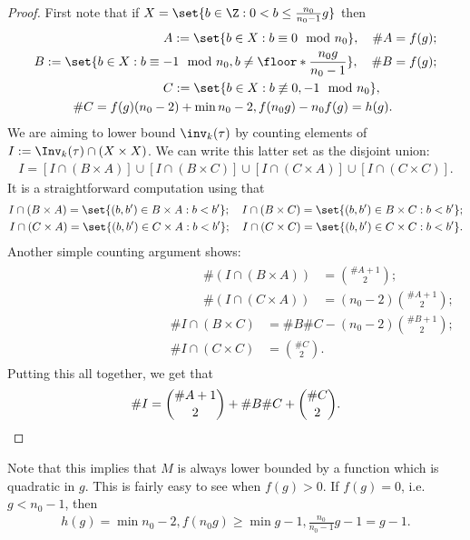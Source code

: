 \begin{proof}
    First note that if $X = \set{b \in \Z: 0<b\leq \frac{n_0}{n_0-1}g}$ then
    \begin{align*}
        A:= \set{b \in X:b \equiv 0 \mod n_0}, \quad \#A &= f(g);\\
        B:= \set{b \in X: b \equiv -1 \mod n_0, b \neq \floor*{\frac{n_0g}{n_0-1}}}, \quad \#B &= f(g);\\
        C:= \set{b \in X:b\not \equiv 0,-1 \mod n_0}, \quad \\\#C = f(g)(n_0-2) + \min{n_0-2,f(n_0g) -n_0 f(g)} = h(g).
    \end{align*}
    We are aiming to lower bound $\inv_k(\tau)$ by counting elements of $I:=\Inv_k(\tau) \cap (X \times X)$. We can write this latter set as the disjoint union:
    \begin{align*}
        I = [I\cap (B\times A)] \cup [I \cap (B\times C)]\cup [I\cap (C\times A)] \cup [I \cap (C\times C)].
    \end{align*}
    It is a straightforward computation using  that
    \begin{align*}
        I \cap (B\times A) = \set{(b,b') \in B\times A:b<b'}; \quad I \cap (B\times C) = \set{(b,b') \in B\times C:b<b'};\\
        I \cap (C\times A) = \set{(b,b') \in C\times A:b<b'}; \quad 
        I \cap (C\times C) = \set{(b,b') \in C\times C:b<b'}.
    \end{align*}
    Another simple counting argument shows:
    \begin{align*}
    \begin{split}
        \#(I \cap (B\times A)) &= \binom{\#A{+}1}{2};\\
        \#(I \cap (C\times A)) &= (n_0{-}2)\binom{\#A{+}1}{2};
    \end{split}
    \begin{split}
        \#I \cap (B \times C) &= \#B\#C - (n_0{-}2)\binom{\#B{+}1}{2};\\
        \#I \cap (C\times C) &=\binom{\#C}{2}.
    \end{split}
    \end{align*}
    Putting this all together, we get that
\[
        \#I = \binom{\#A+1}{2} + \#B\#C + \binom{\#C}{2}. \qedhere
\]
\end{proof}

Note that this implies that $M$ is always lower bounded by a function which is quadratic in $g$. This is fairly easy to see when $f(g) >0$. If $f(g) = 0$, i.e. $g<n_0 -1$, then
\begin{align*}
    h(g) = \min{n_0-2,f(n_0g)} \geq \min{g-1,\frac{n_0}{n_0-1}g-1} = g-1.
\end{align*}

